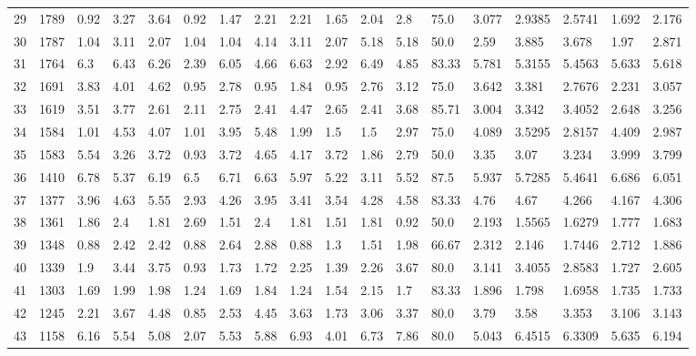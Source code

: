 \documentclass[landscape, 10pt]{report}
\begin{document}
\begin{longtable}{l || l || l | l | l | l | l | l | l | l | l | l | l || l | l | l | l | l}
\rowcolor{lightgray}29 & 1789 & 0.92 & 3.27 & 3.64 & 0.92 & 1.47 & 2.21 & 2.21 & 1.65 & 2.04 & 2.8 & 75.0 & 3.077 & 2.9385 & 2.5741 & 1.692 & 2.176\\ 
30 & 1787 & 1.04 & 3.11 & 2.07 & 1.04 & 1.04 & 4.14 & 3.11 & 2.07 & 5.18 & 5.18 & 50.0 & 2.59 & 3.885 & 3.678 & 1.97 & 2.871\\ 
\rowcolor{lightgray}31 & 1764 & 6.3 & 6.43 & 6.26 & 2.39 & 6.05 & 4.66 & 6.63 & 2.92 & 6.49 & 4.85 & 83.33 & 5.781 & 5.3155 & 5.4563 & 5.633 & 5.618\\ 
32 & 1691 & 3.83 & 4.01 & 4.62 & 0.95 & 2.78 & 0.95 & 1.84 & 0.95 & 2.76 & 3.12 & 75.0 & 3.642 & 3.381 & 2.7676 & 2.231 & 3.057\\ 
\rowcolor{lightgray}33 & 1619 & 3.51 & 3.77 & 2.61 & 2.11 & 2.75 & 2.41 & 4.47 & 2.65 & 2.41 & 3.68 & 85.71 & 3.004 & 3.342 & 3.4052 & 2.648 & 3.256\\ 
34 & 1584 & 1.01 & 4.53 & 4.07 & 1.01 & 3.95 & 5.48 & 1.99 & 1.5 & 1.5 & 2.97 & 75.0 & 4.089 & 3.5295 & 2.8157 & 4.409 & 2.987\\ 
\rowcolor{lightgray}35 & 1583 & 5.54 & 3.26 & 3.72 & 0.93 & 3.72 & 4.65 & 4.17 & 3.72 & 1.86 & 2.79 & 50.0 & 3.35 & 3.07 & 3.234 & 3.999 & 3.799\\ 
36 & 1410 & 6.78 & 5.37 & 6.19 & 6.5 & 6.71 & 6.63 & 5.97 & 5.22 & 3.11 & 5.52 & 87.5 & 5.937 & 5.7285 & 5.4641 & 6.686 & 6.051\\ 
\rowcolor{lightgray}37 & 1377 & 3.96 & 4.63 & 5.55 & 2.93 & 4.26 & 3.95 & 3.41 & 3.54 & 4.28 & 4.58 & 83.33 & 4.76 & 4.67 & 4.266 & 4.167 & 4.306\\ 
38 & 1361 & 1.86 & 2.4 & 1.81 & 2.69 & 1.51 & 2.4 & 1.81 & 1.51 & 1.81 & 0.92 & 50.0 & 2.193 & 1.5565 & 1.6279 & 1.777 & 1.683\\ 
\rowcolor{lightgray}39 & 1348 & 0.88 & 2.42 & 2.42 & 0.88 & 2.64 & 2.88 & 0.88 & 1.3 & 1.51 & 1.98 & 66.67 & 2.312 & 2.146 & 1.7446 & 2.712 & 1.886\\ 
40 & 1339 & 1.9 & 3.44 & 3.75 & 0.93 & 1.73 & 1.72 & 2.25 & 1.39 & 2.26 & 3.67 & 80.0 & 3.141 & 3.4055 & 2.8583 & 1.727 & 2.605\\ 
\rowcolor{lightgray}41 & 1303 & 1.69 & 1.99 & 1.98 & 1.24 & 1.69 & 1.84 & 1.24 & 1.54 & 2.15 & 1.7 & 83.33 & 1.896 & 1.798 & 1.6958 & 1.735 & 1.733\\ 
42 & 1245 & 2.21 & 3.67 & 4.48 & 0.85 & 2.53 & 4.45 & 3.63 & 1.73 & 3.06 & 3.37 & 80.0 & 3.79 & 3.58 & 3.353 & 3.106 & 3.143\\ 
\rowcolor{lightgray}43 & 1158 & 6.16 & 5.54 & 5.08 & 2.07 & 5.53 & 5.88 & 6.93 & 4.01 & 6.73 & 7.86 & 80.0 & 5.043 & 6.4515 & 6.3309 & 5.635 & 6.194\\ 

\end{longtable}
\end{document}

